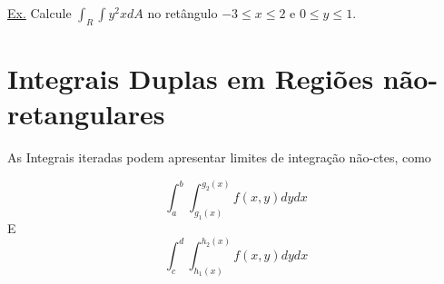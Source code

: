 \documentclass[portugues, 11pt]{article}
\begin{document}
	\underline{Ex.} Calcule $\int_R\int{y^2x}dA$ no retângulo $-3\leq x\leq 2$ e $0 \leq y \leq 1$.
	
	
	\section{Integrais Duplas em Regiões não-retangulares}
	As Integrais iteradas podem apresentar limites de integração não-ctes, como
	
	\begin{equation}
		\int_a^b\int_{g_{1}(x)}^{g_{2}(x)}{f(x,y) dydx}
	\end{equation}
	E
	\begin{equation}
		\int_c^d\int_{h_{1}(x)}^{h_{2}(x)}{f(x,y) dydx}
	\end{equation}
	

  
\end{document}
